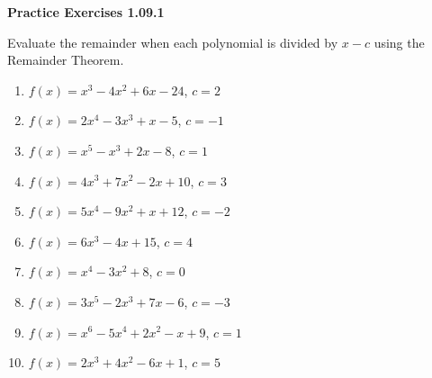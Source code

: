 \vspace{0.3ex}
\noindent\textbf{Practice Exercises 1.09.1}

\vspace{0.2ex}

Evaluate the remainder when each polynomial is divided by \( x - c \) using the Remainder Theorem.
\begin{enumerate}
    \item \( f(x) = x^3 - 4x^2 + 6x - 24 \), \( c = 2 \)
    \item \( f(x) = 2x^4 - 3x^3 + x - 5 \), \( c = -1 \)
    \item \( f(x) = x^5 - x^3 + 2x - 8 \), \( c = 1 \)
    \item \( f(x) = 4x^3 + 7x^2 - 2x + 10 \), \( c = 3 \)
    \item \( f(x) = 5x^4 - 9x^2 + x + 12 \), \( c = -2 \)
    \item \( f(x) = 6x^3 - 4x + 15 \), \( c = 4 \)
    \item \( f(x) = x^4 - 3x^2 + 8 \), \( c = 0 \)
    \item \( f(x) = 3x^5 - 2x^3 + 7x - 6 \), \( c = -3 \)
    \item \( f(x) = x^6 - 5x^4 + 2x^2 - x + 9 \), \( c = 1 \)
    \item \( f(x) = 2x^3 + 4x^2 - 6x + 1 \), \( c = 5 \)
\end{enumerate}